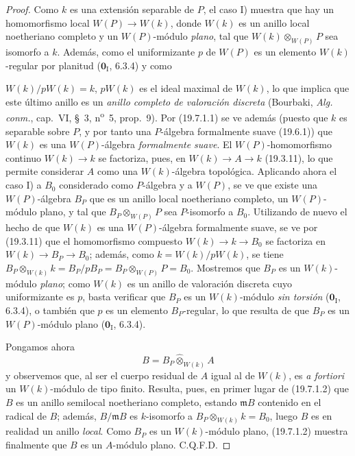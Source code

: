 \begin{proof}
Como $k$ es una extensión separable de $P$, el caso I) muestra que hay un
homomorfismo local $W(P)\to W(k)$, donde $W(k)$ es un anillo local noetheriano
completo y un $W(P)$-módulo \emph{plano}, tal que $W(k)\otimes_{W(P)}P$ sea isomorfo
a $k$. Además, como el uniformizante $p$ de $W(P)$ es un elemento
$W(k)$-regular por planitud ($\mathbf 0_{\mathrm I}$, 6.3.4) y como


$W(k)/pW(k)=k$, $pW(k)$ es el ideal maximal de $W(k)$, lo que implica que este
último anillo es un \emph{anillo completo de valoración discreta} (Bourbaki,
\emph{Alg. conm.}, cap.~VI, §~3, n\textsuperscript{o}~5, prop.~9). Por
(19.7.1.1) se ve además (puesto que $k$ es separable sobre $P$, y por tanto una
$P$-álgebra formalmente suave (19.6.1)) que $W(k)$ es una $W(P)$-álgebra
\emph{formalmente suave}. El $W(P)$-homomorfismo continuo $W(k)\to k$ se
factoriza, pues, en $W(k)\to A\to k$ (19.3.11), lo que permite considerar $A$
como una $W(k)$-álgebra topológica. Aplicando ahora el caso I) a $B_0$
considerado como $P$-álgebra y a $W(P)$, se ve que existe una
$W(P)$-álgebra $B_P$ que es un anillo local noetheriano completo, un
$W(P)$-módulo plano, y tal que $B_P\otimes_{W(P)}P$ sea $P$-isomorfo a
$B_0$. Utilizando de nuevo el hecho de que $W(k)$ es una $W(P)$-álgebra
formalmente suave, se ve por (19.3.11) que el homomorfismo compuesto
$W(k)\to k\to B_0$ se factoriza en $W(k)\to B_P\to B_0$; además, como
$k=W(k)/pW(k)$, se tiene
$B_P\otimes_{W(k)}k=B_P/pB_P=B_P\otimes_{W(P)}P=B_0$. Mostremos que $B_P$ es
un $W(k)$-módulo \emph{plano}; como $W(k)$ es un anillo de valoración discreta
cuyo uniformizante es $p$, basta verificar que $B_P$ es un
$W(k)$-módulo \emph{sin torsión} ($\mathbf 0_{\mathrm I}$, 6.3.4), o también
que $p$ es un elemento $B_P$-regular, lo que resulta de que $B_P$ es un
$W(P)$-módulo plano ($\mathbf 0_{\mathrm I}$, 6.3.4).

Pongamos ahora
\[
  B=B_P\widehat\otimes_{W(k)}A
\]
y observemos que, al ser el cuerpo residual de $A$ igual al de $W(k)$, es
\emph{a fortiori} un $W(k)$-módulo de tipo finito. Resulta, pues, en primer lugar
de (19.7.1.2) que $B$ es un anillo semilocal noetheriano completo,
estando $\mathfrak mB$ contenido en el radical de $B$; además,
$B/\mathfrak mB$ es $k$-isomorfo a
$B_P\otimes_{W(k)}k=B_0$, luego $B$ es en realidad un anillo \emph{local}. Como $B_P$
es un $W(k)$-módulo plano, (19.7.1.2) muestra finalmente que $B$ es un $A$-módulo
plano. C.Q.F.D.
\end{proof}

